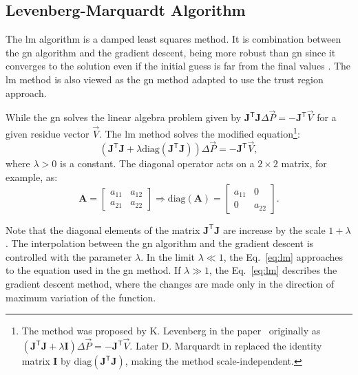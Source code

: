 \subsection{Levenberg-Marquardt Algorithm}
The \gls{lm} algorithm is a damped least squares method. It is combination between the \gls{gn} algorithm and the gradient descent, being more robust than \gls{gn} since it converges to the solution even if the initial guess is far from the final values \cite{numerical_recipes}. The \gls{lm} method is also viewed as the \gls{gn} method adapted to use the trust region approach.

While the \gls{gn} solves the linear algebra problem given by $\mathbf{J}^{\mathsf{T}}\mathbf{J}\Delta \vec{P} = - \mathbf{J}^{\mathsf{T}} \vec{V}$ for a given residue vector $\vec{V}$. The \gls{lm} method solves the modified equation\footnote{The method was proposed by K. Levenberg in the paper~\cite{levenberg} originally as $\left(\mathbf{J}^{\mathsf{T}}\mathbf{J} + \lambda \mathbf{I} \right)\Delta \vec{P} = - \mathbf{J}^{\mathsf{T}}\vec{V}$. Later D. Marquardt in \cite{marquardt} replaced the identity matrix $\mathbf{I}$ by $\mathrm{diag}\left(\mathbf{J}^{\mathsf{T}}\mathbf{J}\right)$, making the method scale-independent.}:
\begin{equation}
    \left(\mathbf{J}^{\mathsf{T}}\mathbf{J} + \lambda \mathrm{diag}\left(\mathbf{J}^{\mathsf{T}}\mathbf{J}\right) \right)\Delta \vec{P} = - \mathbf{J}^{\mathsf{T}}\vec{V},
    \label{eq:lm}
\end{equation}
where $\lambda > 0$ is a constant. The diagonal operator acts on a $2\times 2$ matrix, for example, as:
\begin{equation}
        \mathbf{A} = \begin{bmatrix}
     a_{11} & a_{12} \\
     a_{21} & a_{22} 
\end{bmatrix} \Rightarrow \mathrm{diag}\left(\mathbf{A}\right) = \begin{bmatrix}
     a_{11} & 0 \\
     0 & a_{22}
 \end{bmatrix}.
\end{equation}

Note that the diagonal elements of the matrix $\mathbf{J}^{\mathsf{T}}\mathbf{J}$ are increase by the scale $1 + \lambda$. The interpolation between the \gls{gn} algorithm and the gradient descent is controlled with the parameter $\lambda$. In the limit $\lambda \ll 1$, the Eq.~\eqref{eq:lm} approaches to the equation used in the \gls{gn} method. If $\lambda \gg 1$, the Eq.~\eqref{eq:lm} describes the gradient descent method, where the changes are made only in the direction of maximum variation of the function.

